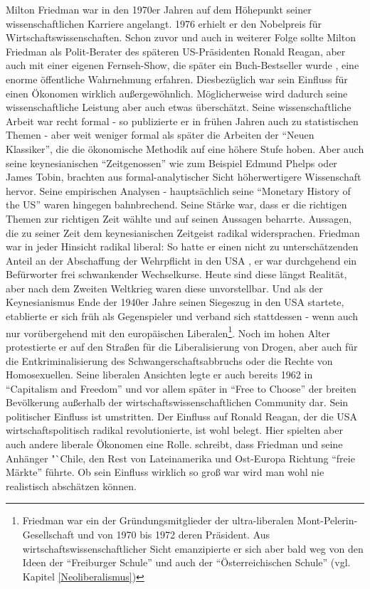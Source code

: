Milton Friedman war in den 1970er Jahren auf dem Höhepunkt seiner wissenschaftlichen Karriere angelangt. 1976 erhielt er den Nobelpreis für Wirtschaftswissenschaften. Schon zuvor und auch in weiterer Folge sollte Milton Friedman als Polit-Berater des späteren US-Präsidenten Ronald Reagan, aber auch mit einer eigenen Fernseh-Show, die später ein Buch-Bestseller wurde \parencite{Friedman1980}, eine enorme öffentliche Wahrnehmung erfahren. Diesbezüglich war sein Einfluss für einen Ökonomen wirklich außergewöhnlich. Möglicherweise wird dadurch seine wissenschaftliche Leistung aber auch etwas überschätzt.
Seine wissenschaftliche Arbeit war recht formal - so publizierte er in frühen Jahren auch zu statistischen Themen - aber weit weniger formal als später die Arbeiten der "`Neuen Klassiker"', die die ökonomische Methodik auf eine höhere Stufe hoben. Aber auch seine keynesianischen "`Zeitgenossen"' wie zum Beispiel Edmund Phelps oder  James Tobin, brachten aus formal-analytischer Sicht höherwertigere Wissenschaft hervor. Seine empirischen Analysen - hauptsächlich seine "`Monetary History of the US"' waren hingegen bahnbrechend.
Seine Stärke war, dass er die richtigen Themen zur richtigen Zeit wählte und auf seinen Aussagen beharrte. Aussagen, die zu seiner Zeit dem keynesianischen Zeitgeist radikal widersprachen. Friedman war in jeder Hinsicht radikal liberal: So hatte er einen nicht zu unterschätzenden Anteil an der Abschaffung der Wehrpflicht in den USA \textcite{Appelbaum2019}, er war durchgehend ein Befürworter frei schwankender Wechselkurse. Heute sind diese längst Realität, aber nach dem Zweiten Weltkrieg waren diese unvorstellbar. Und als der Keynesianismus Ende der 1940er Jahre seinen Siegeszug in den USA startete, etablierte er sich früh als Gegenspieler und verband sich stattdessen - wenn auch nur vorübergehend mit den europäischen Liberalen\footnote{Friedman war ein der Gründungsmitglieder der ultra-liberalen Mont-Pelerin-Gesellschaft und von 1970 bis 1972 deren Präsident. Aus wirtschaftswissenschaftlicher Sicht emanzipierte er sich aber bald weg von den Ideen der "`Freiburger Schule"' und auch der "`Österreichischen Schule"' (vgl. Kapitel \ref{Neoliberalismus})}. Noch im hohen Alter protestierte er auf den Straßen für die Liberalisierung von Drogen, aber auch für die Entkriminalisierung des Schwangerschaftsabbruchs oder die Rechte von Homosexuellen. Seine liberalen Ansichten legte er auch bereits 1962 in "`Capitalism and Freedom"' \parencite{Friedman1962} und vor allem später in "`Free to Choose"' \parencite{Friedman1980} der breiten Bevölkerung außerhalb der wirtschaftswissenschaftlichen Community dar. Sein politischer Einfluss ist umstritten. Der Einfluss auf Ronald Reagan, der die USA wirtschaftspolitisch radikal revolutionierte, ist wohl belegt. Hier spielten aber auch andere liberale Ökonomen eine Rolle. \textcite[S. 77]{Warsh} schreibt, dass Friedman und seine Anhänger "`Chile, den Rest von Lateinamerika und Ost-Europa Richtung "`freie Märkte"' führte. Ob sein Einfluss wirklich so groß war wird man wohl nie realistisch abschätzen können.

